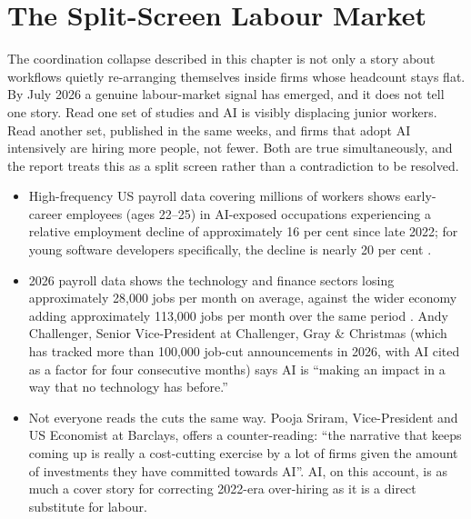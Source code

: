 \section{The Split-Screen Labour Market}
\label{sec:split-screen}

The coordination collapse described in this chapter is not only a story about workflows quietly re-arranging themselves inside firms whose headcount stays flat. By July 2026 a genuine labour-market signal has emerged, and it does not tell one story. Read one set of studies and AI is visibly displacing junior workers. Read another set, published in the same weeks, and firms that adopt AI intensively are hiring more people, not fewer. Both are true simultaneously, and the report treats this as a split screen rather than a contradiction to be resolved.

\begin{evidencebox}[title={Displacement Side: Where the Decline Is Concentrated}]
\begin{itemize}
  \item High-frequency US payroll data covering millions of workers shows early-career employees (ages 22--25) in AI-exposed occupations experiencing a relative employment decline of approximately 16 per cent since late 2022; for young software developers specifically, the decline is nearly 20 per cent \parencite{Brynjolfsson2025Canaries}.
  \item 2026 payroll data shows the technology and finance sectors losing approximately 28,000 jobs per month on average, against the wider economy adding approximately 113,000 jobs per month over the same period \parencite{Challenger2026}. Andy Challenger, Senior Vice-President at Challenger, Gray \& Christmas (which has tracked more than 100,000 job-cut announcements in 2026, with AI cited as a factor for four consecutive months) says AI is ``making an impact in a way that no technology has before.''
  \item Not everyone reads the cuts the same way. Pooja Sriram, Vice-President and US Economist at Barclays, offers a counter-reading: ``the narrative that keeps coming up is really a cost-cutting exercise by a lot of firms given the amount of investments they have committed towards AI''. AI, on this account, is as much a cover story for correcting 2022-era over-hiring as it is a direct substitute for labour.
\end{itemize}
\end{evidencebox}

